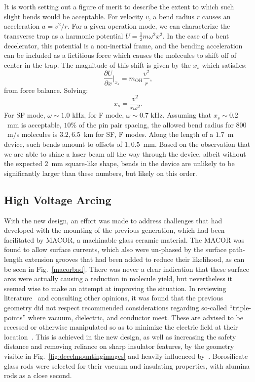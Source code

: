 It is worth setting out a figure of merit to describe the extent to which such slight bends would be acceptable. 
For velocity $v$, a bend radius $r$ causes an acceleration $a=v^2/r$. 
For a given operation mode, we can characterize the transverse trap as a harmonic potential $U=\frac{1}{2}m\omega^2x^2$. 
In the case of a bent decelerator, this potential is a non-inertial frame, and the bending acceleration can be included as a fictitious force which causes the molecules to shift off of center in the trap.
The magnitude of this shift is given by the $x_s$ which satisfies:
\begin{equation}
\frac{\partial U}{\partial x}\biggr|_{x_s} = m_\text{OH}\frac{v^2}{r},
\end{equation}
from force balance. Solving:
\begin{equation}
x_s = \frac{v^2}{r\omega^2}.
\end{equation}
For SF mode, $\omega\sim1.0\text{ kHz}$, for F mode, $\omega\sim0.7\text{ kHz}$. Assuming that $x_s\sim0.2$~mm is acceptable, $10\%$ of the pin pair spacing, the allowed bend radius for $800$~m/s molecules is $3.2, 6.5$~km for SF, F modes.
Along the length of a $1.7$~m device, such bends amount to offsets of $1, 0.5$~mm.
Based on the observation that we are able to shine a laser beam all the way through the device, albeit without the expected $2$~mm square-like shape, bends in the device are unlikely to be significantly larger than these numbers, but likely on this order.

\subsection{High Voltage Arcing}

With the new design, an effort was made to address challenges that had developed with the mounting of the previous generation, which had been facilitated by MACOR, a machinable glass ceramic material.
The MACOR was found to allow surface currents, which also were un-phased by the surface path-length extension grooves that had been added to reduce their likelihood, as can be seen in Fig.~\ref{macorbad}.
There was never a clear indication that these surface arcs were actually causing a reduction in molecule yield, but nevertheless it seemed wise to make an attempt at improving the situation.
In reviewing literature~\cite[Sec.~4.3.3]{Faircloth2013} and consulting other opinions, it was found that the previous geometry did not respect recommended considerations regarding so-called ``triple-points'' where vacuum, dielectric, and conductor meet. 
These are advised to be recessed or otherwise manipulated so as to minimize the electric field at their location~\cite{Miller1989}.
This is achieved in the new design, as well as increasing the safety distance and removing reliance on sharp insulator features, by the geometry visible in Fig.~\ref{fig:decelmountingimages} and heavily influenced by~\citep[Fig.~4]{VanDeMeerakker2006}.
Borosilicate glass rods were selected for their vacuum and insulating properties, with alumina rods as a close second.


